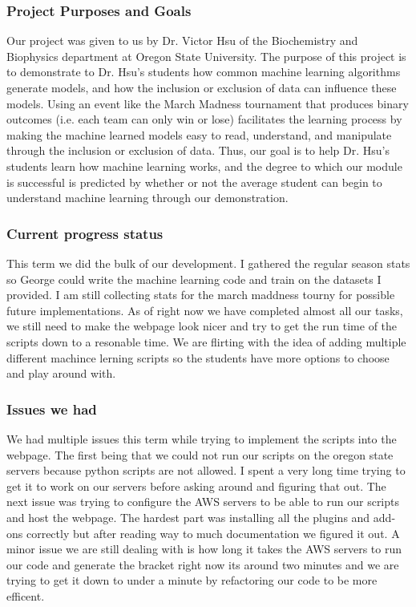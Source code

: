 \documentclass[letterpaper, 10pt,titlepage]{article}
\begin{document}
\subsubsection{Project Purposes and Goals}
\par Our project was given to us by Dr. Victor Hsu of the Biochemistry and Biophysics department at Oregon State University. The purpose of this project is to demonstrate to Dr. Hsu's students how common machine learning algorithms generate models, and how the inclusion or exclusion of data can influence these models. Using an event like the March Madness tournament that produces binary outcomes (i.e. each team can only win or lose) facilitates the learning process by making the machine learned models easy to read, understand, and manipulate through the inclusion or exclusion of data. Thus, our goal is to help Dr. Hsu's students learn how machine learning works, and the degree to which our module is successful is predicted by whether or not the average student can begin to understand machine learning through our demonstration. 

\subsubsection{Current progress status}
\par This term we did the bulk of our development. I gathered the regular season stats so George could write the machine learning code and train on the datasets I provided. I am still collecting stats for the march maddness tourny for possible future implementations. As of right now we have completed almost all our tasks, we still need to make the webpage look nicer and try to get the run time of the scripts down to a resonable time. We are flirting with the idea of adding multiple different machince lerning scripts so the students have more options to choose and play around with.

\subsubsection{Issues we had}
\par We had multiple issues this term while trying to implement the scripts into the webpage. The first being that we could not run our scripts on the oregon state servers because python scripts are not allowed. I spent a very long time trying to get it to work on our servers before asking around and figuring that out. The next issue was trying to configure the AWS servers to be able to run our scripts and host the webpage. The hardest part was installing all the plugins and add-ons correctly but after reading way to much documentation we figured it out. A minor issue we are still dealing with is how long it takes the AWS servers to run our code and generate the bracket right now its around two minutes and we are trying to get it down to under a minute by refactoring our code to be more efficent.
\end{document}
